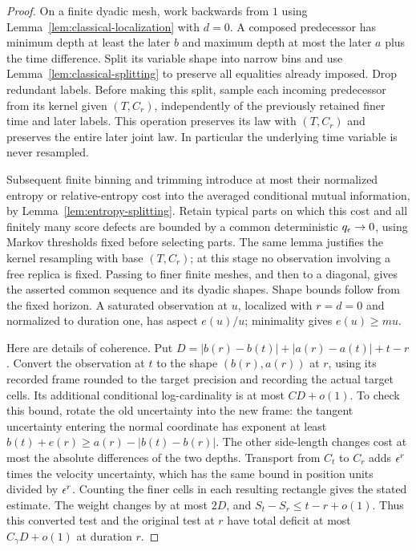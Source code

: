 \begin{proof}
On a finite dyadic mesh, work backwards from $1$ using
Lemma~\ref{lem:classical-localization} with $d=0$.  A composed predecessor
has minimum depth at least the later $b$ and maximum depth at most
the later $a$ plus the time difference.  Split its variable shape into
narrow bins and use Lemma~\ref{lem:classical-splitting} to preserve all
equalities already imposed.  Drop redundant labels.  Before making
this split, sample each incoming predecessor from its kernel given
$(T,C_r)$, independently of the previously retained finer time and
later labels.  This operation preserves its law with $(T,C_r)$ and
preserves the entire later joint law.  In particular the underlying
time variable is never resampled.

Subsequent finite binning and trimming introduce at most their normalized
entropy or relative-entropy cost into the averaged conditional mutual
information, by Lemma~\ref{lem:entropy-splitting}.  Retain typical parts
on which this cost and all finitely many score defects are bounded by
a common deterministic $q_\epsilon\to0$, using Markov thresholds fixed
before selecting parts.  The same lemma justifies the kernel
resampling with base $(T,C_r)$; at this stage no observation involving
a free replica is fixed.  Passing to finer finite meshes, and then to a diagonal,
gives the asserted common sequence and its dyadic shapes.  Shape bounds
follow from the fixed horizon.  A saturated observation at $u$,
localized with $r=d=0$ and normalized to duration one, has aspect
$e(u)/u$; minimality gives $e(u)\ge mu$.

Here are details of coherence.  Put
$D=|b(r)-b(t)|+|a(r)-a(t)|+t-r$.
Convert the observation at $t$ to the shape $(b(r),a(r))$ at $r$, using
its recorded frame rounded to the target precision and recording the
actual target cells.  Its additional conditional log-cardinality is at
most $C D+o(1)$.  To check this bound, rotate the old uncertainty into
the new frame: the tangent uncertainty entering the normal coordinate
has exponent at least
$b(t)+e(r)\ge a(r)-|b(t)-b(r)|$.  The other side-length changes cost
at most the absolute differences of the two depths.  Transport from
$C_t$ to $C_r$ adds $\epsilon^r$ times the velocity uncertainty, which has
the same bound in position units divided by $\epsilon^r$.  Counting the
finer cells in each resulting rectangle gives the stated estimate.
The weight changes by at most $2D$, and $S_t-S_r\le t-r+o(1)$.
Thus this converted test and the original test at $r$ have total
deficit at most $C_\gamma D+o(1)$ at duration $r$.


\end{proof}
